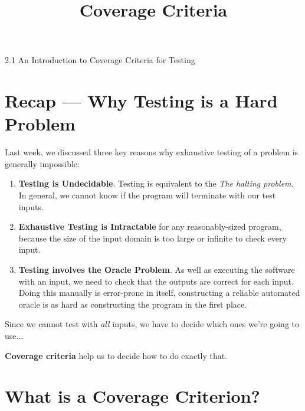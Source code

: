 



\title{Coverage Criteria}{2.1 An Introduction to Coverage Criteria for Testing}

\section{Recap --- Why Testing is a Hard Problem}


Last week, we discussed three key reasons why exhaustive testing of a problem is
generally impossible:


\begin{enumerate}


    \item {\bf Testing is Undecidable}. Testing is equivalent to the
    {\it The halting problem}. In general, we cannot know if the program will
    terminate with our test inputs.


    \item {\bf Exhaustive Testing is Intractable} for any reasonably-sized
    program, because the size of the input domain is too large or infinite to
    check every input.


    \item {\bf Testing involves the Oracle Problem}. As well as executing the
    software with an input, we need to check that the outputs are correct for
    each input. Doing this manually is error-prone in itself, constructing a
    reliable automated oracle is as hard as constructing the program in the
    first place.

\end{enumerate}

Since we cannot test with {\it all} inputs, we have to decide which ones we're
going to use... 

{\bf Coverage criteria} help us to decide how to do exactly that. 


\section{What is a Coverage Criterion?}

